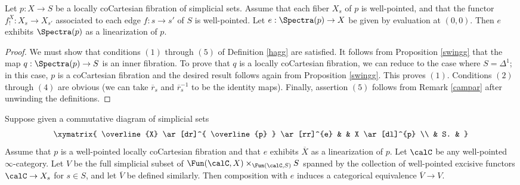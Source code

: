 \begin{proposition}\label{hungr}
Let $p: X \rightarrow S$ be a locally coCartesian fibration of simplicial sets.
Assume that each fiber $X_{s}$ of $p$ is well-pointed, and that the functor
$f^{X}_{!}: X_{s} \rightarrow X_{s'}$ associated to each edge $f: s \rightarrow s'$
of $S$ is well-pointed. Let $e: \Spectra(p) \rightarrow X$ be given by evaluation
at $(0,0)$. Then $e$ exhibits $\Spectra(p)$ as a linearization of $p$.
\end{proposition}

\begin{proof}
We must show that conditions $(1)$ through $(5)$ of Definition \ref{hagg} are satisfied.
It follows from Proposition \ref{swingg} that the map $q: \Spectra(p) \rightarrow S$ is an inner fibration.
To prove that $q$ is a locally coCartesian fibration, we can reduce to the case where
$S = \Delta^1$; in this case, $p$ is a coCartesian fibration and the desired result follows
again from Proposition \ref{swingg}. This proves $(1)$. Conditions $(2)$ through $(4)$ are obvious (we can take $\overline{r}_{s}$ and $\overline{r}_{s}^{-1}$ to be the identity maps).
Finally, assertion $(5)$ follows from Remark \ref{campar} after unwinding the definitions.
\end{proof}

\begin{lemma}\label{huffle}
Suppose given a commutative diagram of simplicial sets
$$ \xymatrix{ \overline{X} \ar[dr]^{ \overline{p} } \ar[rr]^{e} & & X \ar[dl]^{p} \\
& S. & }$$
Assume that $p$ is a well-pointed locally coCartesian fibration and that
$e$ exhibits $\overline{X}$ as a linearization of $p$. Let $\calC$ be
any well-pointed $\infty$-category. Let $V$ be the full simplicial subset
of $\Fun( \calC, X) \times_{ \Fun( \calC, S)} S$ spanned by the collection
of well-pointed excisive functors $\calC \rightarrow X_{s}$ for $s \in S$, and
let $\overline{V}$ be defined similarly. Then composition with $e$ induces
a categorical equivalence $\overline{V} \rightarrow V$.
\end{lemma}

